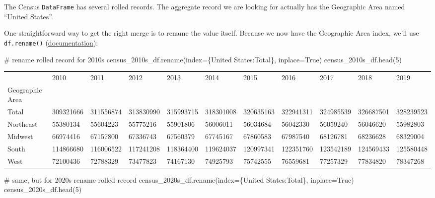 \documentclass[
  letterpaper,
  DIV=11,
  numbers=noendperiod]{scrreprt}
\newenvironment{Shaded}{\begin{snugshade}}{\end{snugshade}}
\newcommand{\CommentTok}[1]{\textcolor[rgb]{0.37,0.37,0.37}{#1}}
\newcommand{\DecValTok}[1]{\textcolor[rgb]{0.68,0.00,0.00}{#1}}
\newcommand{\NormalTok}[1]{\textcolor[rgb]{0.00,0.23,0.31}{#1}}
\newcommand{\OperatorTok}[1]{\textcolor[rgb]{0.37,0.37,0.37}{#1}}
\newcommand{\StringTok}[1]{\textcolor[rgb]{0.13,0.47,0.30}{#1}}
\newcommand{\VariableTok}[1]{\textcolor[rgb]{0.07,0.07,0.07}{#1}}
\begin{document}
The Census \texttt{DataFrame} has several rolled records. The aggregate
record we are looking for actually has the Geographic Area named
``United States''.

One straightforward way to get the right merge is to rename the value
itself. Because we now have the Geographic Area index, we'll use
\texttt{df.rename()}
(\href{https://pandas.pydata.org/docs/reference/api/pandas.DataFrame.rename.html}{documentation}):

\begin{Shaded}
\begin{Highlighting}[]
\CommentTok{\# rename rolled record for 2010s}
\NormalTok{census\_2010s\_df.rename(index}\OperatorTok{=}\NormalTok{\{}\StringTok{\textquotesingle{}United States\textquotesingle{}}\NormalTok{:}\StringTok{\textquotesingle{}Total\textquotesingle{}}\NormalTok{\}, inplace}\OperatorTok{=}\VariableTok{True}\NormalTok{)}
\NormalTok{census\_2010s\_df.head(}\DecValTok{5}\NormalTok{)}
\end{Highlighting}
\end{Shaded}

\begin{longtable}[]{@{}lllllllllll@{}}
\toprule\noalign{}
& 2010 & 2011 & 2012 & 2013 & 2014 & 2015 & 2016 & 2017 & 2018 & 2019 \\
Geographic Area & & & & & & & & & & \\
\midrule\noalign{}
\endhead
\bottomrule\noalign{}
\endlastfoot
Total & 309321666 & 311556874 & 313830990 & 315993715 & 318301008 &
320635163 & 322941311 & 324985539 & 326687501 & 328239523 \\
Northeast & 55380134 & 55604223 & 55775216 & 55901806 & 56006011 &
56034684 & 56042330 & 56059240 & 56046620 & 55982803 \\
Midwest & 66974416 & 67157800 & 67336743 & 67560379 & 67745167 &
67860583 & 67987540 & 68126781 & 68236628 & 68329004 \\
South & 114866680 & 116006522 & 117241208 & 118364400 & 119624037 &
120997341 & 122351760 & 123542189 & 124569433 & 125580448 \\
West & 72100436 & 72788329 & 73477823 & 74167130 & 74925793 & 75742555 &
76559681 & 77257329 & 77834820 & 78347268 \\
\end{longtable}

\begin{Shaded}
\begin{Highlighting}[]
\CommentTok{\# same, but for 2020s rename rolled record}
\NormalTok{census\_2020s\_df.rename(index}\OperatorTok{=}\NormalTok{\{}\StringTok{\textquotesingle{}United States\textquotesingle{}}\NormalTok{:}\StringTok{\textquotesingle{}Total\textquotesingle{}}\NormalTok{\}, inplace}\OperatorTok{=}\VariableTok{True}\NormalTok{)}
\NormalTok{census\_2020s\_df.head(}\DecValTok{5}\NormalTok{)}
\end{Highlighting}
\end{Shaded}
\end{document}
